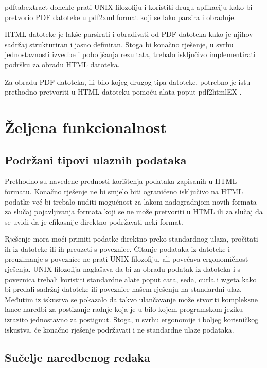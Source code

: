 \documentclass[times, utf8, zavrsni]{fer}
\begin{document}
pdftabextract donekle prati UNIX filozofiju i koristiti drugu aplikaciju kako bi
pretvorio PDF datoteke u pdf2xml format koji se lako parsira i obrađuje.

HTML datoteke je lakše parsirati i obrađivati od PDF datoteka kako je njihov
sadržaj strukturiran i jasno definiran.
Stoga bi konačno rješenje, u svrhu
jednostavnosti izvedbe i poboljšanja rezultata, trebalo isključivo
implementirati podršku za obradu HTML datoteka.

Za obradu PDF datoteka, ili bilo kojeg drugog tipa datoteke,
potrebno je istu prethodno pretvoriti u HTML datoteku pomoću alata poput
pdf2htmlEX \cite{pdf2htmlex_repository}.

\section{Željena funkcionalnost}

\subsection{Podržani tipovi ulaznih podataka}

Prethodno su navedene prednosti korištenja podataka zapisanih u HTML formatu.
Konačno rješenje ne bi smjelo biti ograničeno isključivo na HTML podatke već
bi trebalo nuditi mogućnost za lakom nadogradnjom novih formata za slučaj
pojavljivanja formata koji se ne može pretvoriti u HTML ili za slučaj da se
uvidi da je efikasnije direktno podržavati neki format.

Rješenje mora moći primiti podatke direktno preko standardnog ulaza, pročitati
ih iz datoteke ili ih preuzeti s poveznice. Čitanje podataka iz datoteke i
preuzimanje s poveznice ne prati UNIX filozofiju, ali povećava ergonomičnost
rješenja. UNIX filozofija naglašava da bi za obradu podatak iz datoteka i s
poveznica trebali koristiti standardne alate poput cata, seda, curla i wgeta
kako bi predali sadržaj datoteke ili poveznice našem rješenju na standardni
ulaz. Međutim iz iskustva se pokazalo da takvo ulančavanje može stvoriti
kompleksne lance naredbi za postizanje radnje koja je u bilo kojem programskom
jeziku izrazito jednostavno za postignut. Stoga, u svrhu ergonomije i boljeg
korisničkog iskustva, će konačno rješenje podržavati i ne standardne ulaze
podataka.

\subsection{Sučelje naredbenog redaka}
\end{document}
